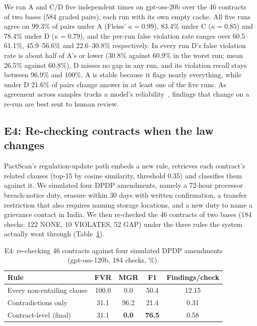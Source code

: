 \documentclass[conference]{IEEEtran}
\begin{document}
We ran A and C/D five independent times on gpt-oss-20b over the 46 contracts of two bases (584 graded pairs), each run with its own empty cache. All five runs agree on 99.3\% of pairs under A (Fleiss' $\kappa=0.99$), 83.4\% under C ($\kappa=0.85$) and 78.4\% under D ($\kappa=0.79$), and the per-run false violation rate ranges over 60.5--61.1\%, 45.9--56.6\% and 22.6--30.8\% respectively. In every run D's false violation rate is about half of A's or lower (30.8\% against 60.9\% in the worst run; mean 26.5\% against 60.8\%), D misses no gap in any run, and its violation recall stays between 96.9\% and 100\%. A is stable because it flags nearly everything, while under D 21.6\% of pairs change answer in at least one of the five runs. As agreement across samples tracks a model's reliability~\cite{wang2023selfconsistency}, findings that change on a re-run are best sent to human review.

\subsection{E4: Re-checking contracts when the law changes}

PactScan's regulation-update path embeds a new rule, retrieves each contract's related clauses (top-15 by cosine similarity, threshold 0.35) and classifies them against it. We simulated four DPDP amendments, namely a 72-hour processor breach-notice duty, erasure within 30 days with written confirmation, a transfer restriction that also requires naming storage locations, and a new duty to name a grievance contact in India. We then re-checked the 46 contracts of two bases (184 checks: 122 NONE, 10 VIOLATES, 52 GAP) under the three rules the system actually went through (Table~\ref{tab:e4}).

\begin{table}[t]
\centering
\caption{E4: re-checking 46 contracts against four simulated DPDP amendments (gpt-oss-120b, 184 checks, \%).}
\label{tab:e4}
\begin{tabular}{lcccc}
\toprule
Rule & FVR & MGR & F1 & Findings/check \\
\midrule
Every non-entailing clause & 100.0 & 0.0 & 50.4 & 12.15 \\
Contradictions only & 31.1 & 96.2 & 21.4 & 0.31 \\
Contract-level (final) & 31.1 & \textbf{0.0} & \textbf{76.5} & 0.58 \\
\bottomrule
\end{tabular}
\end{table}
\end{document}
